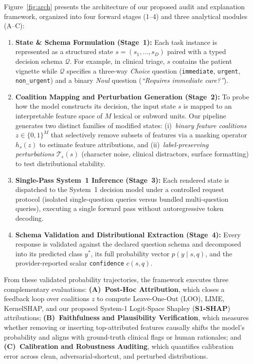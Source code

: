 \documentclass[10pt]{article}
\begin{document}
Figure~\ref{fig:arch} presents the architecture of our proposed audit and explanation framework, organized into four forward stages (1--4) and three analytical modules (A--C):
\begin{enumerate}
\item \textbf{State \& Schema Formulation (Stage~1):} Each task instance is represented as a structured state $s = (s_1, \dots, s_D)$ paired with a typed decision schema $\mathcal{Q}$. For example, in clinical triage, $s$ contains the patient vignette while $\mathcal{Q}$ specifies a three-way \emph{Choice} question (\texttt{immediate}, \texttt{urgent}, \texttt{non\_urgent}) and a binary \emph{Noul} question (\emph{``Requires immediate care?''}).
\item \textbf{Coalition Mapping and Perturbation Generation (Stage~2):} To probe how the model constructs its decision, the input state $s$ is mapped to an interpretable feature space of $M$ lexical or subword units. Our pipeline generates two distinct families of modified states: (i)~\emph{binary feature coalitions} $z \in \{0,1\}^M$ that selectively remove subsets of features via a masking operator $h_s(z)$ to estimate feature attributions, and (ii)~\emph{label-preserving perturbations} $\mathcal{T}_\epsilon(s)$ (character noise, clinical distractors, surface formatting) to test distributional stability.
\item \textbf{Single-Pass System~1 Inference (Stage~3):} Each rendered state is dispatched to the System~1 decision model under a controlled request protocol (isolated single-question queries versus bundled multi-question queries), executing a single forward pass without autoregressive token decoding.
\item \textbf{Schema Validation and Distributional Extraction (Stage~4):} Every response is validated against the declared question schema and decomposed into its predicted class $y^*$, its full probability vector $p(y \mid s, q)$, and the provider-reported scalar \texttt{confidence} $c(s, q)$.
\end{enumerate}
From these validated probability trajectories, the framework executes three complementary evaluations: \textbf{(A)~Post-Hoc Attribution}, which closes a feedback loop over coalitions $z$ to compute Leave-One-Out (LOO), LIME, KernelSHAP, and our proposed System-1 Logit-Space Shapley (\textbf{S1-SHAP}) attributions; \textbf{(B)~Faithfulness and Plausibility Verification}, which measures whether removing or inserting top-attributed features causally shifts the model's probability and aligns with ground-truth clinical flags or human rationales; and \textbf{(C)~Calibration and Robustness Auditing}, which quantifies calibration error across clean, adversarial-shortcut, and perturbed distributions.
\end{document}
